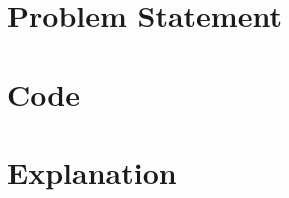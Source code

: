 \documentclass{article}
\begin{document}
    
\section{Problem Statement}



\section{Code}



\newpage
\section{Explanation}
\end{document}
